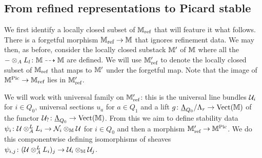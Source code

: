 \documentclass[12pt]{amsart}
\begin{document}

\subsection{From refined representations to Picard stable}

We first identify a locally closed subset of $\mathbb{M}_\text{ref}$ that will feature it what follows.
There is a forgetful morphism $\mathbb{M}_\text{ref} \rightarrow \mathbb{M}$ that ignores refinement data.
We may then, as before, consider the locally closed substack $\mathbb{M}'$ of $\mathbb{M}$ where all the $-\otimes_A L_l \colon \mathbb{M} \dashrightarrow \mathbb{M}$ are defined.
We will use $\mathbb{M}_\text{ref}'$ to denote the locally closed subset of $\mathbb{M}_\text{ref}$ that maps to $\mathbb{M}'$ under the forgetful map.
Note that the image of $\mathbb{M}^{\operatorname{Pic}} \rightarrow \mathbb{M}_\text{ref}$ lies in $\mathbb{M}_\text{ref}'$.


We will work with universal family on $\mathbb{M}_\text{ref}'$: this is the universal line bundles $\mathcal{U}_i$ for $i \in Q_0$, universal sections $u_a$ for $a \in Q_1$ and a lift $g \colon \underline{\Lambda}_{Q_0}/\Lambda_r \rightarrow \operatorname{Vect}(\mathbb{M})$ of the functor $\mathcal{U}_? \colon \underline{\Lambda}_{Q_0} \rightarrow \operatorname{Vect}(\mathbb{M})$.
From this we aim to define stability data $\psi_i \colon \mathcal{U} \otimes_A^L L_i \rightarrow \mathcal{N}_i \otimes_{\mathbb{M}} \mathcal{U}$ for $i\in Q_0$ and then a morphism $\mathbb{M}_\text{ref}' \rightarrow \mathbb{M}^{\operatorname{Pic}}$.
We do this componentwise defining isomorphisms of sheaves $\psi_{i,j} \colon (\mathcal{U} \otimes_A^L L_i)_j \rightarrow \mathcal{U}_i \otimes_{\mathbb{M}} \mathcal{U}_j$.
\end{document}
